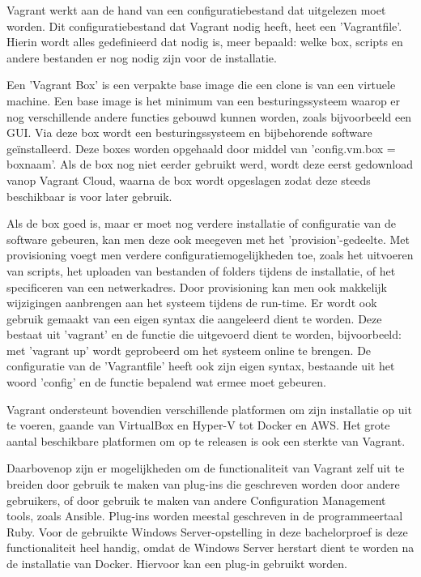Vagrant werkt aan de hand van een configuratiebestand dat uitgelezen moet worden. Dit configuratiebestand dat Vagrant nodig heeft, heet een 'Vagrantfile'. Hierin wordt alles gedefinieerd dat nodig is, meer bepaald: welke box, scripts en andere bestanden er nog nodig zijn voor de installatie.

Een 'Vagrant Box' is een verpakte base image die een clone is van een virtuele machine. Een base image is het minimum van een besturingssysteem waarop er nog verschillende andere functies gebouwd kunnen worden, zoals bijvoorbeeld een GUI. Via deze box wordt een besturingssysteem en bijbehorende software geïnstalleerd. Deze boxes worden opgehaald door middel van 'config.vm.box = boxnaam'. Als de box nog niet eerder gebruikt werd, wordt deze eerst gedownload vanop Vagrant Cloud, waarna de box wordt opgeslagen zodat deze steeds beschikbaar is voor later gebruik.

Als de box goed is, maar er moet nog verdere installatie of configuratie van de software gebeuren, kan men deze ook meegeven met het 'provision'-gedeelte. Met provisioning voegt men verdere configuratiemogelijkheden toe, zoals het uitvoeren van scripts, het uploaden van bestanden of folders tijdens de installatie, of het specificeren van een netwerkadres. Door provisioning kan men ook makkelijk wijzigingen aanbrengen aan het systeem tijdens de run-time. Er wordt ook gebruik gemaakt van een eigen syntax die aangeleerd dient te worden. Deze bestaat uit 'vagrant' en de functie die uitgevoerd dient te worden, bijvoorbeeld: met 'vagrant up' wordt geprobeerd om het systeem online te brengen. De configuratie van de 'Vagrantfile' heeft ook zijn eigen syntax, bestaande uit het woord ’config’ en de functie bepalend wat ermee moet gebeuren.

Vagrant ondersteunt bovendien verschillende platformen om zijn installatie op uit te voeren, gaande van VirtualBox en Hyper-V tot Docker en AWS. Het grote aantal beschikbare platformen om op te releasen is ook een sterkte van Vagrant.

Daarbovenop zijn er mogelijkheden om de functionaliteit van Vagrant zelf uit te breiden door gebruik te maken van plug-ins die geschreven worden door andere gebruikers, of door gebruik te maken van andere Configuration Management tools, zoals Ansible. Plug-ins worden meestal geschreven in de programmeertaal Ruby. Voor de gebruikte Windows Server-opstelling in deze bachelorproef is deze functionaliteit heel handig, omdat de Windows Server herstart dient te worden na de installatie van Docker. Hiervoor kan een plug-in gebruikt worden.

